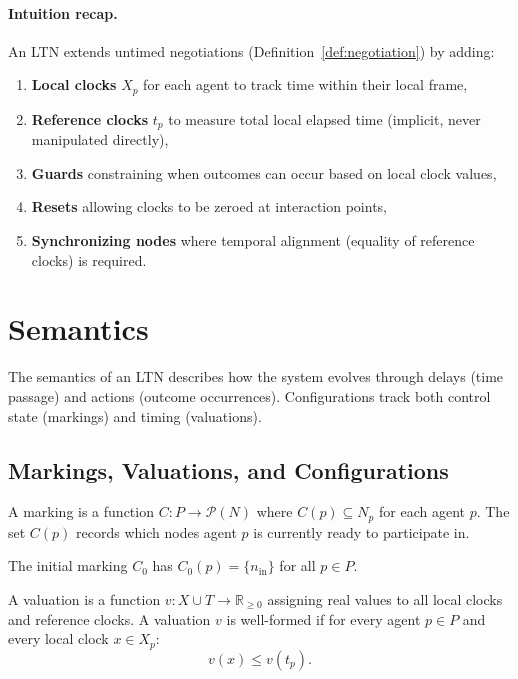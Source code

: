 \paragraph{Intuition recap.} An LTN extends untimed negotiations (Definition~\ref{def:negotiation}) by adding:
\begin{enumerate}
\item \textbf{Local clocks} $X_p$ for each agent to track time within their local frame,
\item \textbf{Reference clocks} $t_p$ to measure total local elapsed time (implicit, never manipulated directly),
\item \textbf{Guards} constraining when outcomes can occur based on local clock values,
\item \textbf{Resets} allowing clocks to be zeroed at interaction points,
\item \textbf{Synchronizing nodes} where temporal alignment (equality of reference clocks) is required.
\end{enumerate}


\section{Semantics}
\label{sec:ltn-semantics}

The semantics of an LTN describes how the system evolves through delays (time passage) and actions (outcome occurrences). Configurations track both control state (markings) and timing (valuations).

\subsection{Markings, Valuations, and Configurations}

\begin{definition}[Marking]
A \textsf{marking} is a function $C : P \to \mathcal{P}(N)$ where $C(p) \subseteq N_p$ for each agent $p$. The set $C(p)$ records which nodes agent $p$ is currently ready to participate in.
\end{definition}

The initial marking $C_0$ has $C_0(p) = \{n_{\text{in}}\}$ for all $p \in P$.

\begin{definition}
A \textsf{valuation} is a function $v : X \cup T \to \mathbb{R}_{\geq 0}$ assigning real values to all local clocks and reference clocks. A valuation $v$ is \textsf{well-formed} if for every agent $p \in P$ and every local clock $x \in X_p$:
\[
v(x) \leq v(t_p).
\]
\end{definition}

